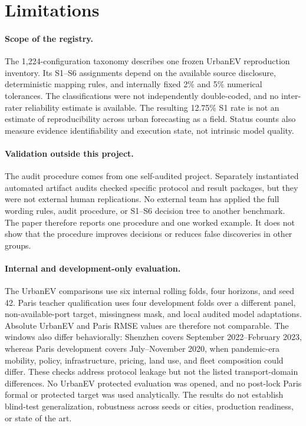 \section{Limitations}
\label{sec:limitations}

\paragraph{Scope of the registry.}
The 1,224-configuration taxonomy describes one frozen UrbanEV reproduction inventory. Its S1--S6 assignments depend on the available source disclosure, deterministic mapping rules, and internally fixed 2\% and 5\% numerical tolerances. The classifications were not independently double-coded, and no inter-rater reliability estimate is available. The resulting 12.75\% S1 rate is not an estimate of reproducibility across urban forecasting as a field. Status counts also measure evidence identifiability and execution state, not intrinsic model quality.

\paragraph{Validation outside this project.}
The audit procedure comes from one self-audited project. Separately instantiated automated artifact audits checked specific protocol and result packages, but they were not external human replications. No external team has applied the full wording rules, audit procedure, or S1--S6 decision tree to another benchmark. The paper therefore reports one procedure and one worked example. It does not show that the procedure improves decisions or reduces false discoveries in other groups.

\paragraph{Internal and development-only evaluation.}
The UrbanEV comparisons use six internal rolling folds, four horizons, and seed 42. Paris teacher qualification uses four development folds over a different panel, non-available-port target, missingness mask, and local audited model adaptations. Absolute UrbanEV and Paris RMSE values are therefore not comparable. The windows also differ behaviorally: Shenzhen covers September 2022--February 2023, whereas Paris development covers July--November 2020, when pandemic-era mobility, policy, infrastructure, pricing, land use, and fleet composition could differ. These checks address protocol leakage but not the listed transport-domain differences. No UrbanEV protected evaluation was opened, and no post-lock Paris formal or protected target was used analytically. The results do not establish blind-test generalization, robustness across seeds or cities, production readiness, or state of the art.

